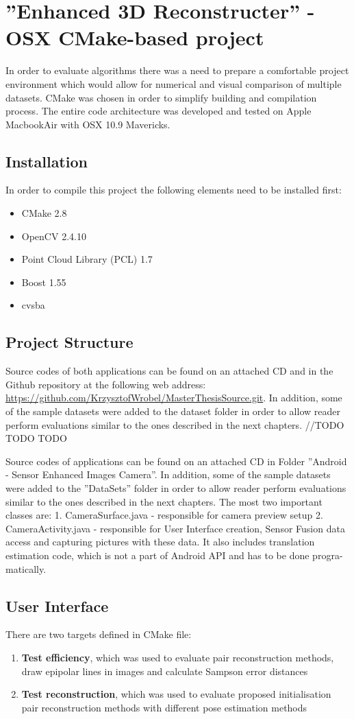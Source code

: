 \section{''Enhanced 3D Reconstructer'' - OSX CMake-based project}
In order to evaluate algorithms there was a need to prepare a comfortable project environment which would allow for numerical and visual comparison of multiple datasets. CMake was chosen in order to simplify building and compilation process. The entire code architecture was developed and tested on Apple MacbookAir with OSX 10.9 Mavericks. 
\subsection{Installation}
In order to compile this project the following elements need to be installed first:
\begin{itemize}
\item CMake 2.8
\item OpenCV 2.4.10
\item Point Cloud Library (PCL) 1.7 \cite{website:pcl}
\item Boost 1.55
\item cvsba \cite{website:cvsba}
\end{itemize}
\subsection{Project Structure}
Source codes of both applications can be found on an attached CD and in the Github repository at the following web address: \url{https://github.com/KrzysztofWrobel/MasterThesisSource.git}.  In addition, some of the sample datasets were added to the dataset folder in order to allow reader perform evaluations similar to the ones described in the next chapters.
//TODO TODO TODO 

Source codes of applications can be found on an attached CD in Folder ”Android - Sensor Enhanced Images Camera”. In addition, some of the sample datasets were added to the ”DataSets” folder in order to allow reader perform evaluations similar to the ones described in the next chapters. The most two important classes are:
1. CameraSurface.java - responsible for camera preview setup
2. CameraActivity.java - responsible for User Interface creation, Sensor Fusion data access and capturing pictures with these data. It also includes translation estimation code, which is not a part of Android API and has to be done progra-
matically.

\subsection{User Interface}
There are two targets defined in CMake file:
\begin{enumerate}
\item \textbf{Test efficiency}, which was used to evaluate pair reconstruction methods, draw epipolar lines in images and calculate Sampson error distances
\item \textbf{Test reconstruction}, which was used to evaluate proposed initialisation pair reconstruction methods with different pose estimation methods
\end{enumerate}
